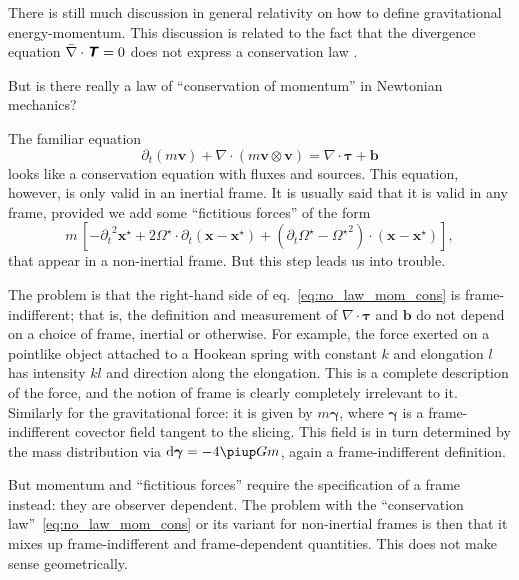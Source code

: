 \documentclass[\ifafour a4paper,12pt,\else a5paper,10pt,\fi%
onecolumn,oneside,article,%
british%
]{memoir}
\theoremstyle{remark}
\theoremstyle{innote}
\newcommand*{\mathte}[1]{\textbf{\textit{\textsf{#1}}}}
\renewcommand*{\cites}{\parencites}
\newcommand*{\de}{\partialup}%
\newcommand*{\pu}{\piup}%
\newcommand*{\di}{\mathrm{d}}%
\renewcommand*{\|}{\nonscript\,\vert\nonscript\;\mathopen{}}
\newcommand*{\sect}{\S}%
\newcommand*{\eqn}{eq.}%
\newcommand*{\ydd}{m}
\newcommand*{\yd}{\ydd}
\newcommand*{\yTT}{\tau}
\newcommand*{\yT}{\bm{\yTT}}
\newcommand*{\yTTf}{T}
\newcommand*{\yTf}{\mathte{\yTTf}}
\newcommand*{\ybbf}{b}
\newcommand*{\ybf}{\bm{\ybbf}}
\newcommand*{\yxxt}{x}
\newcommand*{\yxt}{\bm{\yxxt}}
\newcommand*{\yxto}{\bm{\yxxt}^{\mathord{\star}}}
\newcommand*{\yvvt}{v}
\newcommand*{\yvt}{\bm{\yvvt}}
\newcommand*{\yffg}{\gamma}
\newcommand*{\yfg}{\bm{\yffg}}
\newcommand*{\yomm}{\varOmega}
\newcommand*{\yom}{\bm{\yomm}^{\mathord{\star}}}
\newcommand*{\ynab}{\nabla}
\newcommand*{\ynaf}{\Bar{\nabla}}
\begin{document}
There is still much discussion in general relativity on how to define
gravitational energy-momentum. This discussion is related to the fact that
the divergence equation $\ynaf\cdot\yTf=0$ does not express a conservation
law \cites[\sect~96]{landauetal1939_t1994}{arminjon2016}.

But is there really a law of \enquote{conservation of momentum} in
Newtonian mechanics?

The familiar equation
\begin{equation}
  \label{eq:no_law_mom_cons}
  \de_t(\yd\yvt) + \ynab\cdot(\yd\yvt\otimes\yvt) = \ynab\cdot\yT +\ybf
\end{equation}
looks like a conservation equation with fluxes and sources. This equation,
however, is only valid in an inertial frame. It is usually said that it is
valid in any frame, provided we add some \enquote{fictitious forces} of the
form
\begin{equation}
  \label{eq:fictitious_forces}
  m\, [-{\de_t}^2\yxto%
  + 2\yom\cdot\de_t(\yxt-\yxto) + (\de_t\yom-{\yom}^2)\cdot(\yxt-\yxto)],
\end{equation}
that appear in a non-inertial frame. But this step leads us into trouble.

The problem is that the right-hand side of \eqn~\eqref{eq:no_law_mom_cons}
is frame-indifferent; that is, the definition and measurement of
$\ynab\cdot\yT$ and $\ybf$ do not depend on a choice of frame, inertial or
otherwise. For example, the force exerted on a pointlike object attached to
a Hookean spring with constant $k$ and elongation $l$ has intensity $kl$
and direction along the elongation. This is a complete description of the
force, and the notion of frame is clearly completely irrelevant to it.
Similarly for the gravitational force: it is given by $\yd\yfg$, where
$\yfg$ is a frame-indifferent covector field tangent to the slicing. This
field is in turn determined by the mass distribution via
$\di\yfg = - 4\pu G \yd$, again a frame-indifferent definition.

But momentum and \enquote{fictitious forces} require the specification of a
frame instead: they are observer dependent. The problem with the
\enquote{conservation law}~\eqref{eq:no_law_mom_cons} or its variant for
non-inertial frames is then that it mixes up frame-indifferent and
frame-dependent quantities. This does not make sense geometrically.
\end{document}
